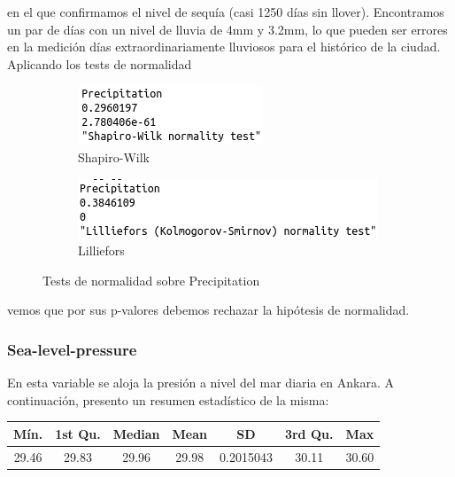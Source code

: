 en el que confirmamos el nivel de sequía (casi 1250 días sin llover). Encontramos un par de días con un nivel de lluvia de 4mm y 3.2mm, lo que pueden ser errores en la medición días extraordinariamente lluviosos para el histórico de la ciudad. Aplicando los tests de normalidad

\begin{figure}[H]
	\centering
	\begin{subfigure}{.5\textwidth}
		\centering
		\includegraphics[width=.7\linewidth]{shapiro-prec.png}
		\caption{Shapiro-Wilk}
		\label{fig:sw-pre}
	\end{subfigure}%
	\begin{subfigure}{.5\textwidth}
		\centering
		\includegraphics[width=.7\linewidth]{lillie-pre.png}	\caption{Lilliefors}
		\label{fig:l-pre}
	\end{subfigure}
	\caption{Tests de normalidad sobre Precipitation}
	\label{fig:norm-pre}
\end{figure}

vemos que por sus p-valores debemos rechazar la hipótesis de normalidad. 

\subsubsection{Sea-level-pressure}

En esta variable se aloja la presión a nivel del mar diaria en Ankara. A continuación, presento un resumen estadístico de la misma:

\begin{table}[H]
	\centering
	\begin{tabular}{|c|c|c|c|c|c|c|}
		\hline
		Mín.  & 1st Qu. & Median & Mean  & SD        & 3rd Qu. & Max   \\ \hline
		29.46 & 29.83   & 29.96  & 29.98 & 0.2015043 & 30.11   & 30.60 \\ \hline
	\end{tabular}
\end{table}

